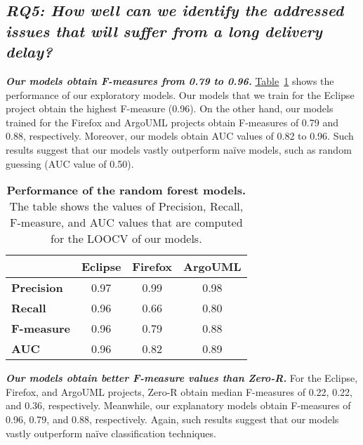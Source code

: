 \subsection*{\textbf{\textit{RQ5: How well can we identify the addressed issues
that will suffer from a long delivery delay?}}}

\noindent\textit{\textbf{Our models obtain 
F-measures from 0.79 to 0.96.}}
\hyperref[ch4:tbl:RFclassificationResult_ab]{Table}~\ref{ch4:tbl:RFclassificationResult_ab}
shows the performance of our exploratory models. Our models that we train for the Eclipse
project obtain the
highest F-measure (0.96). On the other hand, our models trained for the Firefox
and ArgoUML projects
obtain F-measures of 0.79 and 0.88, respectively. Moreover, our models obtain
AUC values of 0.82 to 0.96. Such results suggest that our models vastly
outperform na\"{i}ve models, such as random guessing (AUC value of 0.50).  \\

\begin{table}
	\footnotesize
	\centering
	\caption{\textbf{Performance of the random forest models.} The table
		shows the values of Precision, Recall, F-measure, and AUC values that
	are computed for the LOOCV of our models.}
	\label{ch4:tbl:RFclassificationResult_ab}
	\begin{tabular}{lccc}
		\cline{2-4} 
		& \textbf{Eclipse} & \textbf{Firefox} & \textbf{ArgoUML}\tabularnewline
		\hline 
		\textbf{Precision} & 0.97 & 0.99 & 0.98\tabularnewline
		\hline 
		\textbf{Recall} & 0.96 & 0.66 & 0.80\tabularnewline
		\hline 
		\textbf{F-measure} & 0.96 & 0.79 & 0.88\tabularnewline
		\hline 
		\textbf{AUC} & 0.96 & 0.82 & 0.89\tabularnewline
		\hline 
	\end{tabular}
\end{table}

\noindent\textit{\textbf{Our models obtain better F-measure values than
Zero-R.}} For the Eclipse, Firefox, and ArgoUML projects, Zero-R obtain median F-measures
of 0.22, 0.22, and 0.36, respectively. Meanwhile, our explanatory models obtain
F-measures of 0.96, 0.79, and 0.88, respectively. Again, such results suggest
that our models vastly outperform na\"{i}ve classification techniques.  \\


